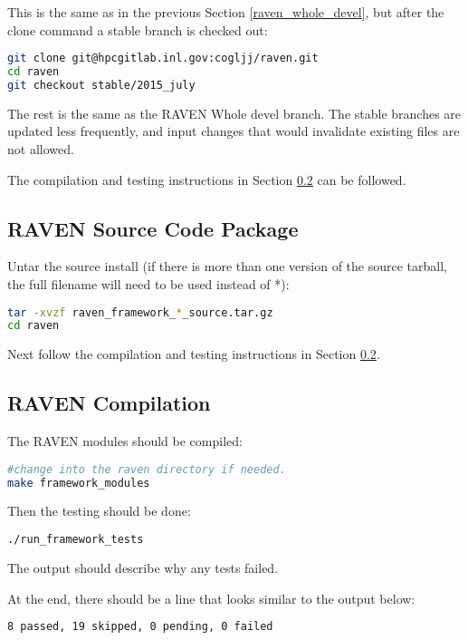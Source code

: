 This is the same as in the previous Section \ref{raven_whole_devel},
but after the clone command a stable branch is checked out:

\begin{lstlisting}[language=bash]
git clone git@hpcgitlab.inl.gov:cogljj/raven.git
cd raven
git checkout stable/2015_july
\end{lstlisting}

The rest is the same as the RAVEN Whole devel branch.  The stable
branches are updated less frequently, and input changes that would
invalidate existing files are not allowed.

The compilation and testing instructions in Section
\ref{raven_compilation} can be followed.

\subsection{RAVEN Source Code Package}
\label{raven_source_package}

Untar the source install (if there is more than one version of the
source tarball, the full filename will need to be used instead of *):

\begin{lstlisting}[language=bash]
tar -xvzf raven_framework_*_source.tar.gz
cd raven
\end{lstlisting}

Next follow the compilation and testing instructions in Section
\ref{raven_compilation}.

\subsection{RAVEN Compilation}
\label{raven_compilation}

The RAVEN modules should be compiled:

\begin{lstlisting}[language=bash]
#change into the raven directory if needed.
make framework_modules
\end{lstlisting}

Then the testing should be done:

\begin{lstlisting}[language=bash]
./run_framework_tests
\end{lstlisting}

The output should describe why any tests failed.

At the end, there should be a line that looks similar to the output below:
\begin{lstlisting}[language=bash]
8 passed, 19 skipped, 0 pending, 0 failed
\end{lstlisting}

